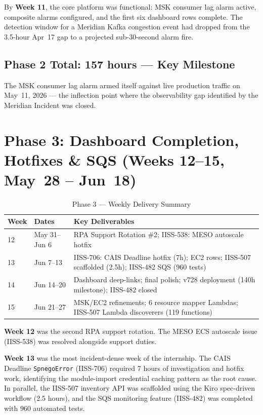 By \textbf{Week 11}, the core platform was functional: MSK consumer lag
alarm active, composite alarms configured, and the first six dashboard rows
complete. The detection window for a Meridian Kafka congestion event had
dropped from the 3.5-hour Apr~17 gap to a projected sub-30-second alarm fire.

\subsection{Phase 2 Total: 157 hours --- Key Milestone}

The MSK consumer lag alarm armed itself against live production traffic
on May~11, 2026 --- the inflection point where the observability gap
identified by the Meridian Incident was closed.

\section{Phase 3: Dashboard Completion, Hotfixes \& SQS (Weeks 12--15, May~28 -- Jun~18)}
\label{sec:wb_phase3}

\begin{table}[ht]
\centering
\caption{Phase 3 --- Weekly Delivery Summary}
\label{tab:wb_phase3}
\begin{tabular}{p{1.2cm}p{4.0cm}p{7.5cm}}
\toprule
\textbf{Week} & \textbf{Dates} & \textbf{Key Deliverables} \\
\midrule
12 & May 31--Jun 6 & RPA Support Rotation \#2; IISS-538: MESO autoscale hotfix \\
13 & Jun 7--13 & IISS-706: CAIS Deadline hotfix (7h); EC2 rows; IISS-507 scaffolded (2.5h); IISS-482 SQS (960 tests) \\
14 & Jun 14--20 & Dashboard deep-links; final polish; v728 deployment (140h milestone); IISS-482 closed \\
15 & Jun 21--27 & MSK/EC2 refinements; 6 resource mapper Lambdas; IISS-507 Lambda discoverers (119 functions) \\
\bottomrule
\end{tabular}
\end{table}

\textbf{Week 12} was the second RPA support rotation. The MESO ECS
autoscale issue (IISS-538) was resolved alongside support duties.

\textbf{Week 13} was the most incident-dense week of the internship.
The CAIS Deadline \texttt{SpnegoError} (IISS-706) required 7 hours of
investigation and hotfix work, identifying the module-import credential
caching pattern as the root cause. In parallel, the IISS-507 inventory
API was scaffolded using the Kiro spec-driven workflow (2.5 hours), and
the SQS monitoring feature (IISS-482) was completed with 960 automated tests.

